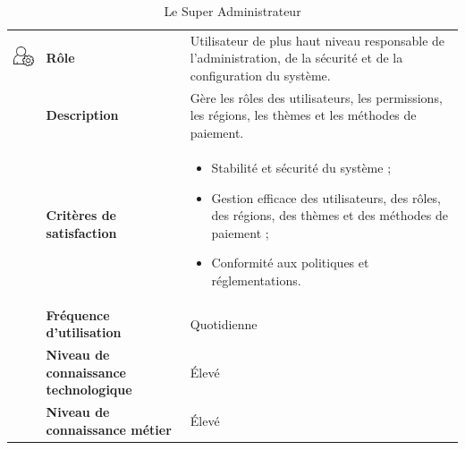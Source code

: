 \documentclass[12pt]{report}
\begin{document}
				\begin{longtable}{|p{3cm}|p{4cm}|p{7cm}|}
				  \caption{Le Super Administrateur}
				  \label{tab:acteurSupAdm}\\
				  \hline
				\endfirsthead
				\hline
				\endhead				
				\begin{minipage}{3cm}
					\includegraphics[width=2cm]{supAdm.png}
				\end{minipage} & \textbf{Rôle} & Utilisateur de plus haut niveau responsable de l'administration, de la sécurité et de la configuration du système.\\ \cline{2-3}
						& \textbf{Description} & Gère les rôles des utilisateurs, les permissions, les régions, les thèmes et les méthodes de paiement. \\ \cline{2-3}
						& \textbf{Critères de satisfaction} & \begin{itemize}
																\item Stabilité et sécurité du système ;
																\item Gestion efficace des utilisateurs, des rôles, des régions, des thèmes et des méthodes de paiement ;
																\item Conformité aux politiques et réglementations.
															\end{itemize}\\ \cline{2-3}
						&\textbf{Fréquence d’utilisation} & Quotidienne \\  \cline{2-3}
						&\textbf{Niveau de connaissance technologique} & Élevé \\  \cline{2-3}
						&\textbf{Niveau de connaissance métier} & Élevé \\ 
				\hline
				\end{longtable}
				\FloatBarrier
\end{document}
